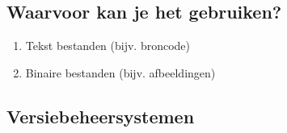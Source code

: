 \documentclass[]{beamer}
\begin{document}
\subsection{Waarvoor kan je het gebruiken?}

\begin{frame}
    \begin{enumerate}
        \item Tekst bestanden (bijv. broncode)
        \item Binaire bestanden (bijv. afbeeldingen)
    \end{enumerate}
\end{frame}

\subsection{Versiebeheersystemen}

\end{document}
